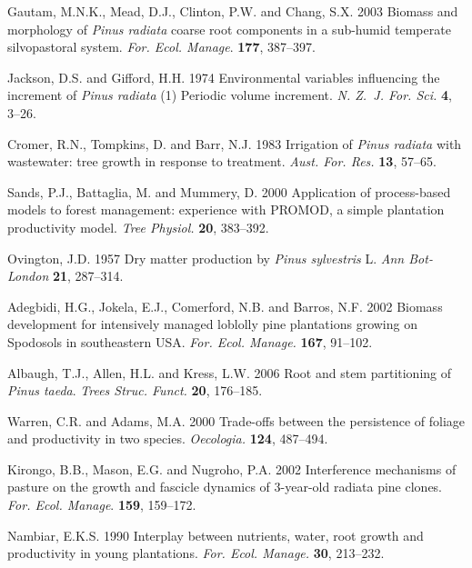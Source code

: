 \documentclass[final]{foresj}
\begin{document}
\begin{thebibliography}
Gautam, M.N.K., Mead, D.J., Clinton, P.W. and Chang, S.X.
2003 Biomass and morphology of \textit{Pinus radiata}
coarse root components in a sub-humid temperate
silvopastoral system. \textit{For. Ecol. Manage}.
\textbf{177}, 387--397.

Jackson, D.S. and Gifford, H.H. 1974 Environmental
variables influencing the increment of \textit{Pinus
radiata} (1) Periodic volume increment. \textit{N. Z.~J.
For. Sci.} \textbf{4}, 3--26.

Cromer, R.N., Tompkins, D. and Barr, N.J. 1983 Irrigation
of \textit{Pinus radiata} with wastewater: tree growth in
response to treatment. \textit{Aust. For. Res.}
\textbf{13}, 57--65.

Sands, P.J., Battaglia, M. and Mummery, D. 2000 Application
of process-based models to forest management: experience
with PROMOD, a simple plantation productivity model.
\textit{Tree Physiol.} \textbf{20}, 383--392.

Ovington, J.D. 1957 Dry matter production by \textit{Pinus
sylvestris} L. \textit{Ann Bot-London }\textbf{21},
287--314.

Adegbidi, H.G., Jokela, E.J., Comerford, N.B. and Barros,
N.F. 2002 Biomass development for intensively managed
loblolly pine plantations growing on Spodosols in
southeastern USA. \textit{For. Ecol. Manage.} \textbf{167},
91--102.

Albaugh, T.J., Allen, H.L. and Kress, L.W. 2006 Root and
stem partitioning of \textit{Pinus taeda}. \textit{Trees
Struc. Funct.} \textbf{20}, 176--185.

Warren, C.R. and Adams, M.A. 2000 Trade-offs between the
persistence of foliage and productivity in two species.
\textit{Oecologia. }\textbf{124}, 487--494.

Kirongo, B.B., Mason, E.G. and Nugroho, P.A. 2002
Interference mechanisms of pasture on the growth and
fascicle dynamics of 3-year-old radiata pine clones.
\textit{For. Ecol. Manage}. \textbf{159}, 159--172.

Nambiar, E.K.S. 1990 Interplay between nutrients, water,
root growth and productivity in young plantations.
\textit{For. Ecol. Manage.} \textbf{30}, 213--232.



\end{thebibliography}
\end{document}
